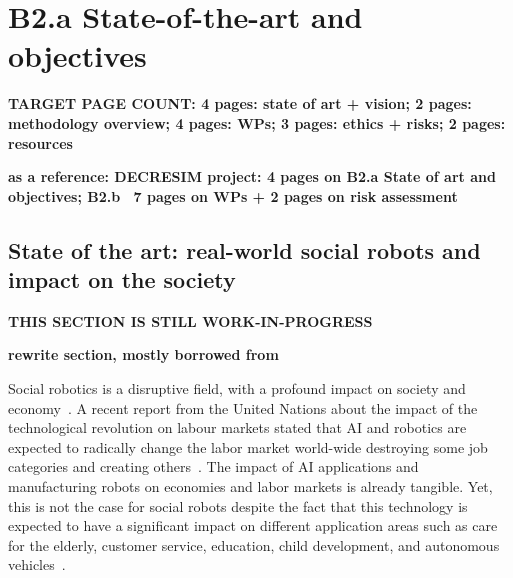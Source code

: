 \documentclass[11pt,a4paper]{report}
\newcommand{\TODO}[1]{{\color{red}\textbf{#1}}}
\newcommand{\eu}[1]{}
\begin{document}
\chapter{B2.a State-of-the-art and objectives}

\eu{(B2.a, B2.b, B2.c: max 15 pages (2 pages for B2.c)}
\eu{Specify the proposal objectives in the context of the state
of the art in the research field. It should be clear how and why the proposed work is important for
the field, and what impact it will have if successful, such as how it may open up new horizons or
opportunities for science, technology or scholarship. Specify any particularly challenging or
unconventional aspects of the proposal, including multi- or inter-disciplinary aspects.}

\TODO{TARGET PAGE COUNT: 4 pages: state of art + vision; 2 pages: methodology overview; 4 pages:
WPs; 3 pages: ethics + risks; 2 pages: resources}

\TODO{as a reference: DECRESIM project: 4 pages on B2.a State of art and
objectives; B2.b ~7 pages on WPs + 2 pages on risk assessment}



\section{State of the art: real-world social robots and impact on the
society}

\TODO{THIS SECTION IS STILL WORK-IN-PROGRESS}


\TODO{rewrite section, mostly borrowed from~\cite{tulli2019great}}

Social robotics is a disruptive field, with a profound impact on
society and economy~\cite{williams2020social}. A recent report from the United
Nations about the impact of the technological revolution on labour markets
stated that AI and robotics are expected to radically change the labor market
world-wide destroying some job categories and creating
others~\cite{bruckner2017frontier}. The impact
of AI applications and manufacturing robots on economies and labor markets is
already tangible. Yet, this is not the case for social robots despite the fact that
this technology is expected to have a significant impact on different application
areas such as care for the elderly, customer service, education, child development,
and autonomous vehicles~\cite{baillie2019challenges}.
\end{document}
